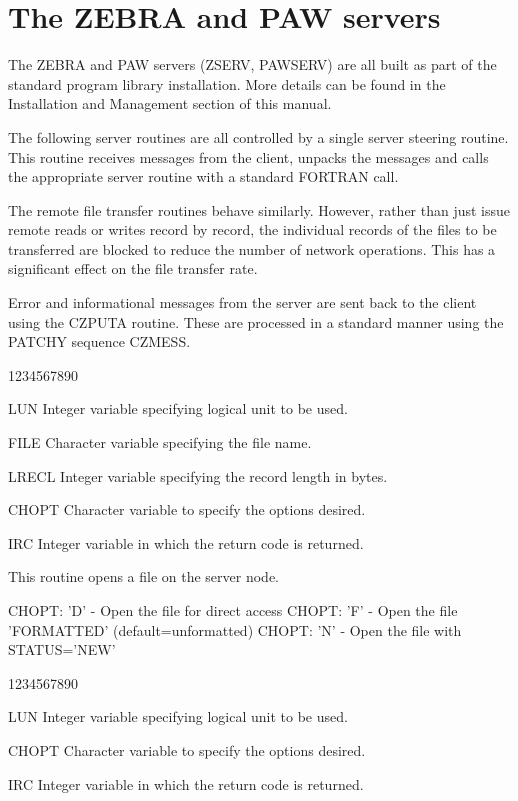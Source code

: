 \chapter{The ZEBRA and PAW servers}
\par
The ZEBRA and PAW servers (ZSERV, PAWSERV)
are all built as part of the standard
program library installation. More details can be found in the
Installation and Management section of this manual.
\par
The following server routines are all controlled by a single
server steering routine. This routine receives messages
from the client, unpacks the messages and calls the appropriate
server routine with a standard FORTRAN call.
\par
The remote file transfer routines behave similarly. However,
rather than just issue remote reads or writes record by
record, the individual records of the files to be transferred
are blocked to reduce the number of network operations.
This has a significant effect on the file transfer rate.
\par
Error and informational messages from the server are sent
back to the client using the CZPUTA routine. These are processed
in a standard manner using the PATCHY sequence CZMESS.
\begin{DLtt}{1234567890}
\item[LUN]Integer variable specifying logical unit to be used.
\item[FILE]Character variable specifying the file name.
\item[LRECL]Integer variable specifying the record length in bytes.
\item[CHOPT]Character variable to specify the options desired.
\item[IRC]Integer variable in which the return code is returned.
\end{DLtt}
\par
This routine opens a file on the server node.
\begin{XMP}
CHOPT: 'D' - Open the file for direct access
CHOPT: 'F' - Open the file 'FORMATTED' (default=unformatted)
CHOPT: 'N' - Open the file with STATUS='NEW'
\end{XMP}
\begin{DLtt}{1234567890}
\item[LUN]Integer variable specifying logical unit to be used.
\item[CHOPT]Character variable to specify the options desired.
\item[IRC]Integer variable in which the return code is returned.
\end{DLtt}
